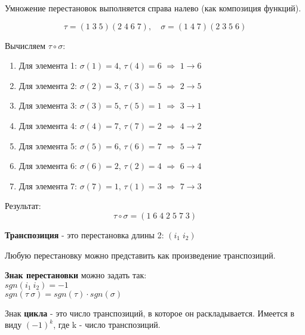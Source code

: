 \documentclass[12pt]{article}
\begin{document}
\begin{examplebox}
    Умножение перестановок выполняется справа налево (как композиция функций).
    
    \[
        \tau = (1\;3\;5)(2\;4\;6\;7), \quad \sigma = (1\;4\;7)(2\;3\;5\;6)
    \]
    
    Вычисляем $\tau \circ \sigma$:
    \begin{enumerate}
        \item Для элемента 1: $\sigma(1)=4$, $\tau(4)=6$ $\Rightarrow$ $1\to6$
        \item Для элемента 2: $\sigma(2)=3$, $\tau(3)=5$ $\Rightarrow$ $2\to5$
        \item Для элемента 3: $\sigma(3)=5$, $\tau(5)=1$ $\Rightarrow$ $3\to1$
        \item Для элемента 4: $\sigma(4)=7$, $\tau(7)=2$ $\Rightarrow$ $4\to2$
        \item Для элемента 5: $\sigma(5)=6$, $\tau(6)=7$ $\Rightarrow$ $5\to7$
        \item Для элемента 6: $\sigma(6)=2$, $\tau(2)=4$ $\Rightarrow$ $6\to4$
        \item Для элемента 7: $\sigma(7)=1$, $\tau(1)=3$ $\Rightarrow$ $7\to3$
    \end{enumerate}
    
    Результат:
    \[
        \tau \circ \sigma = (1\;6\;4\;2\;5\;7\;3)
    \]
\end{examplebox}

\begin{definitionbox}
    \textbf{Транспозиция} - это перестановка длины 2: $(i_1\;i_2)$ 
\end{definitionbox}

\begin{theorembox}
    Любую перестановку можно представить как произведение транспозиций.
\end{theorembox}

\begin{definitionbox}
    \textbf{Знак перестановки} можно задать так:\\
    $sgn(i_1\ i_2) = -1$\\
    $sgn(\tau \ \sigma) = sgn(\tau) \cdot sgn(\sigma)$
\end{definitionbox}

\begin{remarkbox}
    Знак \textbf{цикла} - это число транспозиций, в которое он раскладывается. Имеется в виду $(-1)^k$, где k - число транспозиций.
\end{remarkbox}
\end{document}
